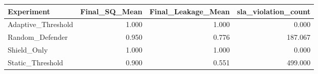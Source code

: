 \begin{tabular}{lrrr}
\toprule
Experiment & Final_SQ_Mean & Final_Leakage_Mean & sla_violation_count \\
\midrule
Adaptive_Threshold & 1.000 & 1.000 & 0.000 \\
Random_Defender & 0.950 & 0.776 & 187.067 \\
Shield_Only & 1.000 & 1.000 & 0.000 \\
Static_Threshold & 0.900 & 0.551 & 499.000 \\
\bottomrule
\end{tabular}
